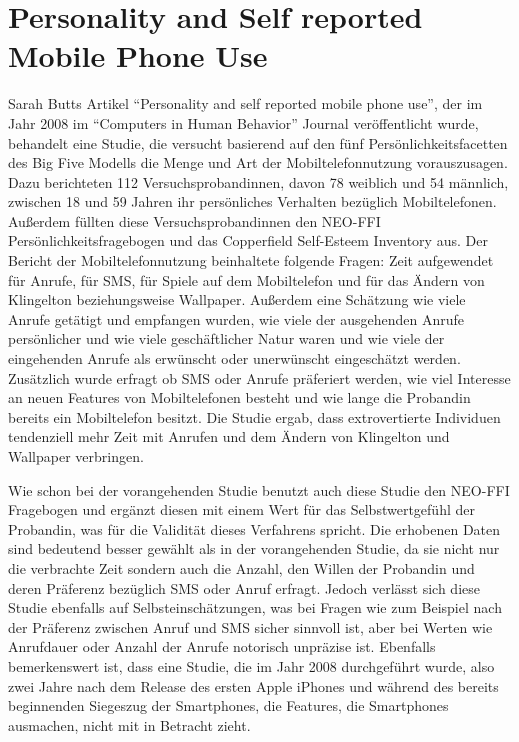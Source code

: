 \section*{Personality and Self reported Mobile Phone Use}

Sarah Butts Artikel "`Personality and self reported mobile phone use"', der im Jahr 2008 im "`Computers in Human Behavior"' Journal veröffentlicht wurde,
behandelt eine Studie, die versucht basierend auf den fünf Persönlichkeitsfacetten des Big Five Modells die Menge und Art der Mobiltelefonnutzung vorauszusagen.
Dazu berichteten 112 Versuchsprobandinnen, davon 78 weiblich und 54 männlich, zwischen 18 und 59 Jahren ihr persönliches Verhalten bezüglich Mobiltelefonen.
Außerdem füllten diese Versuchsprobandinnen den NEO-FFI Persönlichkeitsfragebogen und das Copperfield Self-Esteem Inventory aus.
Der Bericht der Mobiltelefonnutzung beinhaltete folgende Fragen: Zeit aufgewendet für Anrufe, für SMS, für Spiele auf dem Mobiltelefon und für das Ändern von Klingelton beziehungsweise Wallpaper.
Außerdem eine Schätzung wie viele Anrufe getätigt und empfangen wurden, wie viele der ausgehenden Anrufe persönlicher und wie viele geschäftlicher Natur waren und wie viele der eingehenden Anrufe als erwünscht oder unerwünscht eingeschätzt werden.
Zusätzlich wurde erfragt ob SMS oder Anrufe präferiert werden, wie viel Interesse an neuen Features von Mobiltelefonen besteht und wie lange die Probandin bereits ein Mobiltelefon besitzt.
Die Studie ergab, dass extrovertierte Individuen tendenziell mehr Zeit mit Anrufen und dem Ändern von Klingelton und Wallpaper verbringen.
\par
Wie schon bei der vorangehenden Studie benutzt auch diese Studie den NEO-FFI Fragebogen und ergänzt diesen mit einem Wert für das Selbstwertgefühl der Probandin, was für die Validität dieses Verfahrens spricht.
Die erhobenen Daten sind bedeutend besser gewählt als in der vorangehenden Studie, da sie nicht nur die verbrachte Zeit sondern auch die Anzahl, den Willen der Probandin und deren Präferenz bezüglich SMS oder Anruf erfragt.
Jedoch verlässt sich diese Studie ebenfalls auf Selbsteinschätzungen, was bei Fragen wie zum Beispiel nach der Präferenz zwischen Anruf und SMS sicher sinnvoll ist, aber bei Werten wie Anrufdauer oder Anzahl der Anrufe notorisch unpräzise ist.
Ebenfalls bemerkenswert ist, dass eine Studie, die im Jahr 2008 durchgeführt wurde, also zwei Jahre nach dem Release des ersten Apple iPhones und während des bereits beginnenden Siegeszug der Smartphones, die Features, die Smartphones ausmachen, nicht mit in Betracht zieht.


